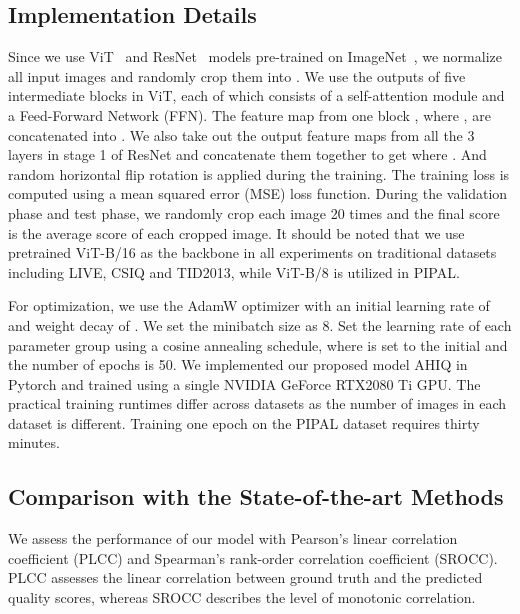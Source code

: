 \documentclass[10pt,twocolumn,letterpaper]{article}
\begin{document}
\subsection{Implementation Details}
Since we use ViT~\cite{dosovitskiy2020image} and ResNet~\cite{he2016deep} models pre-trained on ImageNet~\cite{ILSVRC15}, we normalize all input images and randomly crop them into . We use the outputs of five intermediate blocks  in ViT, each of which consists of a self-attention module and a Feed-Forward Network (FFN). The feature map from one block , where , are concatenated into . We also take out the output feature maps from all the 3 layers in stage 1 of ResNet and concatenate them together to get  where . And random horizontal flip rotation is applied during the training. The training loss is computed using a mean squared error (MSE) loss function. During the validation phase and test phase, we randomly crop each image 20 times and the final score is the average score of each cropped image. It should be noted that we use pretrained ViT-B/16 as the backbone in all experiments on traditional datasets including LIVE, CSIQ and TID2013, while ViT-B/8 is utilized in PIPAL.

For optimization, we use the AdamW optimizer with an initial learning rate  of  and weight decay of . We set the minibatch size as 8. Set the learning rate of each parameter group using a cosine annealing schedule, where  is set to the initial  and the number of epochs  is 50. 
We implemented our proposed model AHIQ in Pytorch and trained using a single NVIDIA GeForce RTX2080 Ti GPU. The practical training runtimes differ across datasets as the number of images in each dataset is different. Training one epoch on the PIPAL dataset requires thirty minutes.

\subsection{Comparison with the State-of-the-art Methods}
We assess the performance of our model with Pearson’s linear
correlation coefficient (PLCC) and Spearman’s rank-order correlation coefficient (SROCC). 
PLCC assesses the linear correlation between ground truth and the predicted quality scores, whereas SROCC describes the level of monotonic correlation.
\end{document}
